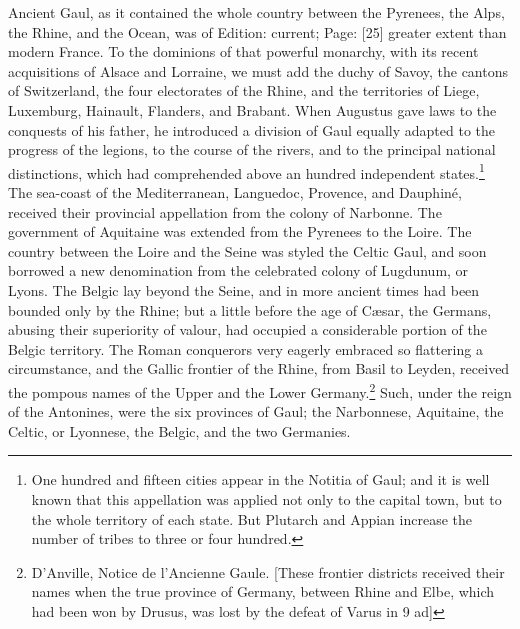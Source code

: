 Ancient Gaul, as it contained the whole country between the Pyrenees, the Alps, the Rhine, and the Ocean, was of Edition: current; Page: [25] greater extent than modern France. To the dominions of that powerful monarchy, with its recent acquisitions of Alsace and Lorraine, we must add the duchy of Savoy, the cantons of Switzerland, the four electorates of the Rhine, and the territories of Liege, Luxemburg, Hainault, Flanders, and Brabant. When Augustus gave laws to the conquests of his father, he introduced a division of Gaul equally adapted to the progress of the legions, to the course of the rivers, and to the principal national distinctions, which had comprehended above an hundred independent states.\footnote{One hundred and fifteen cities appear in the Notitia of Gaul; and it is well known that this appellation was applied not only to the capital town, but to the whole territory of each state. But Plutarch and Appian increase the number of tribes to three or four hundred.} The sea-coast of the Mediterranean, Languedoc, Provence, and Dauphiné, received their provincial appellation from the colony of Narbonne. The government of Aquitaine was extended from the Pyrenees to the Loire. The country between the Loire and the Seine was styled the Celtic Gaul, and soon borrowed a new denomination from the celebrated colony of Lugdunum, or Lyons. The Belgic lay beyond the Seine, and in more ancient times had been bounded only by the Rhine; but a little before the age of Cæsar, the Germans, abusing their superiority of valour, had occupied a considerable portion of the Belgic territory. The Roman conquerors very eagerly embraced so flattering a circumstance, and the Gallic frontier of the Rhine, from Basil to Leyden, received the pompous names of the Upper and the Lower Germany.\footnote{D\texthebrew{}’Anville, Notice de l\texthebrew{}’Ancienne Gaule. [These frontier districts received their names when the true province of Germany, between Rhine and Elbe, which had been won by Drusus, was lost by the defeat of Varus in 9 ad]} Such, under the reign of the Antonines, were the six provinces of Gaul; the Narbonnese, Aquitaine, the Celtic, or Lyonnese, the Belgic, and the two Germanies.

